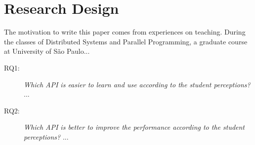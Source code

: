 \section{Research Design}
\label{sec:researchdesing}

The motivation to write this paper comes from experiences on teaching. During the classes of Distributed Systems and Parallel Programming, a graduate course at University of São Paulo...

\begin{description}
\item[RQ1:] \textit{Which API is easier to learn and use according to the student perceptions?}
%
...
\item[RQ2:] \textit{Which API is better to improve the performance according to the student perceptions?}
%
...

\end{description}	
